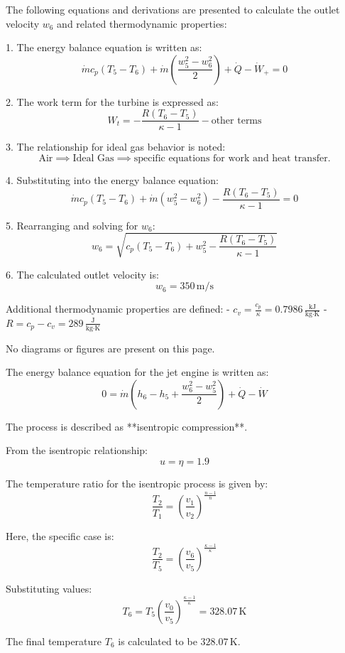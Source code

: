 The following equations and derivations are presented to calculate the outlet velocity \( w_6 \) and related thermodynamic properties:

1. The energy balance equation is written as:  
\[
\dot{m} c_p (T_5 - T_6) + \dot{m} \left( \frac{w_5^2 - w_6^2}{2} \right) + \dot{Q} - \dot{W}_+ = 0
\]

2. The work term for the turbine is expressed as:  
\[
W_t = -\frac{R (T_6 - T_5)}{\kappa - 1} - \text{other terms}
\]

3. The relationship for ideal gas behavior is noted:  
\[
\text{Air} \implies \text{Ideal Gas} \implies \text{specific equations for work and heat transfer.}
\]

4. Substituting into the energy balance equation:  
\[
\dot{m} c_p (T_5 - T_6) + \dot{m} (w_5^2 - w_6^2) - \frac{R (T_6 - T_5)}{\kappa - 1} = 0
\]

5. Rearranging and solving for \( w_6 \):  
\[
w_6 = \sqrt{c_p (T_5 - T_6) + w_5^2 - \frac{R (T_6 - T_5)}{\kappa - 1}}
\]

6. The calculated outlet velocity is:  
\[
w_6 = 350 \, \text{m/s}
\]

Additional thermodynamic properties are defined:  
- \( c_v = \frac{c_p}{\kappa} = 0.7986 \, \frac{\text{kJ}}{\text{kg·K}} \)  
- \( R = c_p - c_v = 289 \, \frac{\text{J}}{\text{kg·K}} \)

No diagrams or figures are present on this page.

The energy balance equation for the jet engine is written as:  
\[
0 = \dot{m} \left( h_6 - h_5 + \frac{w_6^2 - w_5^2}{2} \right) + \dot{Q} - \dot{W}
\]  

The process is described as **isentropic compression**.  

From the isentropic relationship:  
\[
u = \eta = 1.9
\]  

The temperature ratio for the isentropic process is given by:  
\[
\frac{T_2}{T_1} = \left( \frac{v_1}{v_2} \right)^{\frac{n-1}{n}}
\]  

Here, the specific case is:  
\[
\frac{T_2}{T_5} = \left( \frac{v_6}{v_5} \right)^{\frac{\kappa-1}{\kappa}}
\]  

Substituting values:  
\[
T_6 = T_5 \left( \frac{v_0}{v_5} \right)^{\frac{\kappa-1}{\kappa}} = 328.07 \, \text{K}
\]  

The final temperature \( T_6 \) is calculated to be \( 328.07 \, \text{K} \).